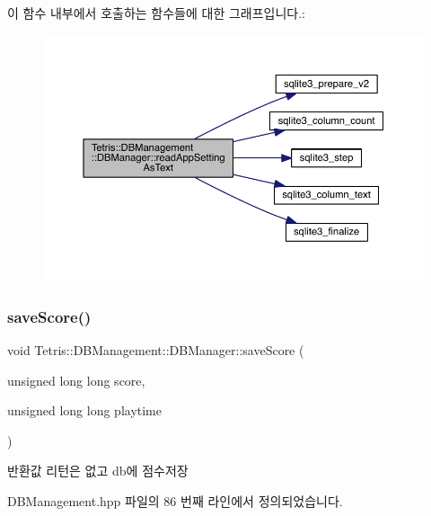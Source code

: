 이 함수 내부에서 호출하는 함수들에 대한 그래프입니다.\+:
\nopagebreak
\begin{figure}[H]
\begin{center}
\leavevmode
\includegraphics[width=350pt]{da/d79/class_tetris_1_1_d_b_management_1_1_d_b_manager_acb213c517f06d1eadafd45a86b91c2ff_cgraph}
\end{center}
\end{figure}
\mbox{\label{class_tetris_1_1_d_b_management_1_1_d_b_manager_aef16da1d2e564caa309bfc3b3e419d7e}} 
\subsubsection{\texorpdfstring{save\+Score()}{saveScore()}}
{\footnotesize\ttfamily void Tetris\+::\+D\+B\+Management\+::\+D\+B\+Manager\+::save\+Score (\begin{DoxyParamCaption}\item[{unsigned long long}]{score,  }\item[{unsigned long long}]{playtime }\end{DoxyParamCaption})\hspace{0.3cm}{\ttfamily [inline]}}

\begin{DoxyReturn}{반환값}
리턴은 없고 db에 점수저장 
\end{DoxyReturn}


D\+B\+Management.\+hpp 파일의 86 번째 라인에서 정의되었습니다.


